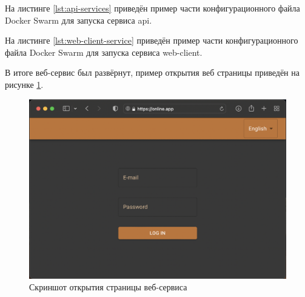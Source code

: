 На листинге \ref{lst:api-services} приведён пример части конфигурационного файла Docker Swarm для запуска сервиса api.



На листинге \ref{lst:web-client-service} приведён пример части конфигурационного файла Docker Swarm для запуска сервиса web-client.



В итоге веб-сервис был развёрнут, пример открытия веб страницы приведён на рисунке \ref{fig:app-screen}.

\begin{figure}[ht]
    \centering
    \includegraphics[scale=0.4]{src/figures/app-screen}
    \caption{Скриншот открытия страницы веб-сервиса}
    \label{fig:app-screen}
\end{figure}

